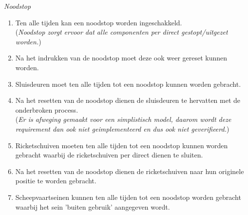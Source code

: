 \documentclass{article}
\begin{document}
        \newpage
        \noindent\textit{Noodstop}
        \begin{enumerate}
            \item Ten alle tijden kan een noodstop worden ingeschakkeld. \\
            (\textit{Noodstop zorgt ervoor dat alle componenten per direct gestopt/uitgezet worden.})
            \item Na het indrukken van de noodstop moet deze ook weer gereset kunnen worden.
            \item Sluisdeuren moet ten alle tijden tot een noodstop kunnen worden
            gebracht.
            \item Na het resetten van de noodstop dienen de sluisdeuren te hervatten
            met de onderbroken process. \\
            (\textit{Er is afweging gemaakt voor een simplistisch model,
            daarom wordt deze requirement dan ook niet geimplementeerd en dus ook niet geverifieerd.})
            \item Ricketschuiven moeten ten alle tijden tot een noodstop kunnen worden 
            gebracht waarbij de ricketschuiven per direct dienen te sluiten.
            \item Na het resetten van de noodstop dienen de ricketschuiven naar 
            hun originele positie te worden gebracht.
            \item Scheepvaartseinen kunnen ten alle tijden tot een noodstop worden
            gebracht waarbij het sein 'buiten gebruik' aangegeven wordt.
        \end{enumerate}

\newpage
\end{document}
